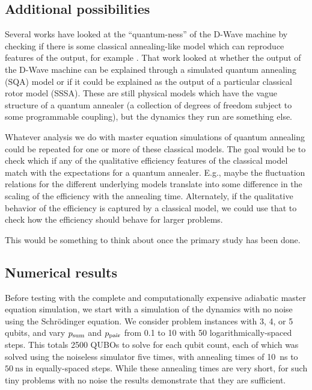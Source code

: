 \documentclass[aps,pra,amsmath,amssymb,amsfonts,lengthcheck,twocolumn,superscriptaddress]{revtex4-1}
\begin{document}
\subsection{Additional possibilities}

Several works have looked at the ``quantum-ness'' of the D-Wave machine by checking if there is some classical annealing-like model which can reproduce features of the output, for example \cite{Albash2015b}. 
That work looked at whether the output of the D-Wave machine can be explained through a simulated quantum annealing (SQA) model or if it could be explained as the output of a particular classical rotor model (SSSA).
These are still physical models which have the vague structure of a quantum annealer (a collection of degrees of freedom subject to some programmable coupling), but the dynamics they run are something else.

Whatever analysis we do with master equation simulations of quantum annealing could be repeated for one or more of these classical models.
The goal would be to check which if any of the qualitative efficiency features of the classical model match with the expectations for a quantum annealer. 
E.g., maybe the fluctuation relations for the different underlying models translate into some difference in the scaling of the efficiency with the annealing time.
Alternately, if the qualitative behavior of the efficiency is captured by a classical model, we could use that to check how the efficiency should behave for larger problems.

This would be something to think about once the primary study has been done.

\subsection{Numerical results}

Before testing with the complete and computationally expensive adiabatic master equation simulation, we start with a simulation of the dynamics with no noise using the Schr\"odinger equation.
We consider problem instances with 3, 4, or 5 qubits, and vary $p_{\rm sum}$ and $p_{\rm pair}$ from 0.1 to 10 with 50 logarithmically-spaced steps.
This totals 2500 QUBOs to solve for each qubit count, each of which was solved using the noiseless simulator five times, with annealing times of \SI{10}{\nano\second} to $\SI{50}{\nano\second}$ in equally-spaced steps. 
While these annealing times are very short, for such tiny problems with no noise the results demonstrate that they are sufficient.
\end{document}
